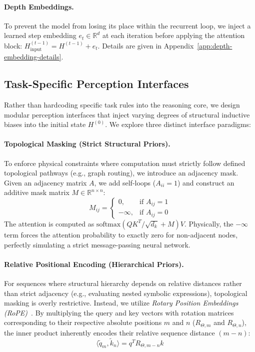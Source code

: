 \paragraph{Depth Embeddings.}

To prevent the model from losing its place within the recurrent loop, we inject a learned step embedding $e_t \in \mathbb{R}^d$ at each iteration before applying the attention block: $H^{(t-1)}_{\text{input}} = H^{(t-1)} + e_t$. Details are given in Appendix~\ref{app:depth-embedding-details}.
 
\subsection{Task-Specific Perception Interfaces}
\label{sec:perception}

Rather than hardcoding specific task rules into the reasoning core, we design modular perception interfaces that inject varying degrees of structural inductive biases into the initial state $H^{(0)}$. We explore three distinct interface paradigms:

\paragraph{Topological Masking (Strict Structural Priors).}

To enforce physical constraints where computation must strictly follow defined topological pathways (e.g., graph routing), we introduce an adjacency mask. Given an adjacency matrix $A$, we add self-loops ($A_{ii} = 1$) and construct an additive mask matrix $M \in \mathbb{R}^{n \times n}$:
\begin{equation}
M_{ij} = 
\begin{cases} 
0, & \text{if } A_{ij} = 1 \\
-\infty, & \text{if } A_{ij} = 0
\end{cases}
\end{equation}
The attention is computed as $\text{softmax}(QK^T/\sqrt{d_k} + M)V$. Physically, the $-\infty$ term forces the attention probability to exactly zero for non-adjacent nodes, perfectly simulating a strict message-passing neural network.

\paragraph{Relative Positional Encoding (Hierarchical Priors).}

For sequences where structural hierarchy depends on relative distances rather than strict adjacency (e.g., evaluating nested symbolic expressions), topological masking is overly restrictive. Instead, we utilize \emph{Rotary Position Embeddings (RoPE)}~\citep{su2024roformer}. By multiplying the query and key vectors with rotation matrices corresponding to their respective absolute positions $m$ and $n$ ($R_{\Theta, m}$ and $R_{\Theta, n}$), the inner product inherently encodes their relative sequence distance $(m - n)$:
\begin{equation}
\langle \tilde{q}_m, \tilde{k}_n \rangle = q^T R_{\Theta, m-n} k
\end{equation}

